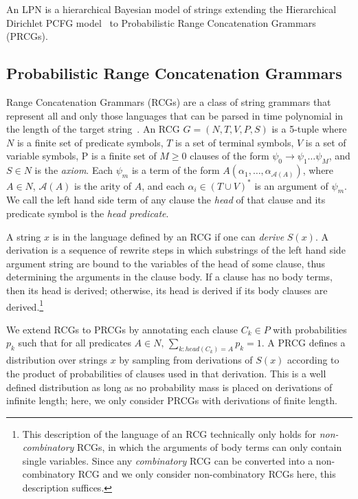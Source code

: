 \documentclass{article} %
\begin{document}
An LPN is a hierarchical Bayesian model of strings extending the
Hierarchical Dirichlet PCFG model~\cite{johnson2007bayesian} to
Probabilistic Range Concatenation Grammars (PRCGs).

\subsection{Probabilistic Range Concatenation Grammars}
Range Concatenation Grammars (RCGs) are a class of string grammars
that represent all and only those languages that can be parsed in time
polynomial in the length of the target
string~\cite{boullier2005range}. An RCG $G=(N, T, V, P, S)$ is a
5-tuple where $N$ is a finite set of predicate symbols, $T$ is a set
of terminal symbols, $V$ is a set of variable symbols, P is a finite
set of $M \geq 0$ clauses of the form $\psi_0 \rightarrow \psi_1 \dots
\psi_M$, and $S \in N$ is the \emph{axiom}. Each $\psi_m$ is a term of
the form $A(\alpha_1, \dots, \alpha_{\mathcal{A}(A)})$, where $A \in
N$, $\mathcal{A}(A)$ is the arity of $A$, and each $\alpha_i \in (T
\cup V)^*$ is an argument of $\psi_m$. We call the left hand side term
of any clause the \emph{head} of that clause and its predicate symbol
is the \emph{head predicate}.

A string $x$ is in the language defined by an RCG if one can
\emph{derive} $S(x)$. A derivation is a sequence of rewrite steps in
which substrings of the left hand side argument string are bound to
the variables of the head of some clause, thus determining the
arguments in the clause body. If a clause has no body terms, then its
head is derived; otherwise, its head is derived if its body clauses
are derived.\footnote{This description of the language of an RCG
  technically only holds for \emph{non-combinatory} RCGs, in which the
  arguments of body terms can only contain single variables. Since any
  \emph{combinatory} RCG can be converted into a non-combinatory RCG
  and we only consider non-combinatory RCGs here, this description
  suffices.}

We extend RCGs to PRCGs by annotating each clause $C_k \in P$ with
probabilities $p_k$ such that for all predicates ${A \in N, \,
  \sum_{k:head(C_k)=A} p_k = 1}$. A PRCG defines a distribution over
strings $x$ by sampling from derivations of $S(x)$ according to the
product of probabilities of clauses used in that derivation. This is a
well defined distribution as long as no probability mass is placed on
derivations of infinite length; here, we only consider PRCGs
with derivations of finite length.
\end{document}
